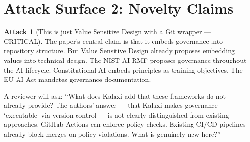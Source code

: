 \documentclass[12pt,a4paper]{article}
\theoremstyle{definition}
\newtheorem{attack}{Attack}[section]
\begin{document}
\section{Attack Surface 2: Novelty Claims}

\begin{attack}[This is just Value Sensitive Design with a Git wrapper — CRITICAL]
\label{att:vsd}
The paper's central claim is that it embeds governance into repository structure.
But Value Sensitive Design \cite{friedman2006} already proposes embedding values
into technical design. The NIST AI RMF \cite{nist2023} proposes governance
throughout the AI lifecycle. Constitutional AI \cite{bai2022} embeds principles
as training objectives. The EU AI Act \cite{euaiact2021} mandates governance
documentation.

A reviewer will ask: ``What does Kalaxi add that these frameworks do not already
provide? The authors' answer — that Kalaxi makes governance `executable' via
version control — is not clearly distinguished from existing approaches. GitHub
Actions can enforce policy checks. Existing CI/CD pipelines already block merges
on policy violations. What is genuinely new here?''
\end{attack}
\end{document}

